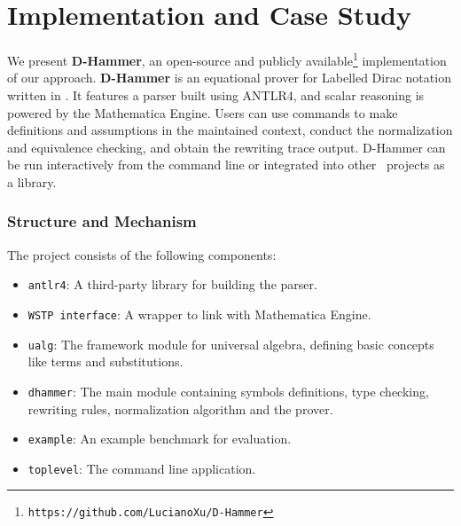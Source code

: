 
\section{Implementation and Case Study}
We present \textbf{D-Hammer}, an open-source
and publicly available\footnote{\texttt{https://github.com/LucianoXu/D-Hammer}}
implementation of our approach.  \textbf{D-Hammer} is an
equational prover for Labelled Dirac notation written in \CC.  It
features a parser built using ANTLR4, and scalar reasoning is powered
by the Mathematica Engine. Users can use commands to make definitions
and assumptions in the maintained context, conduct the normalization
and equivalence checking, and obtain the rewriting trace output.
D-Hammer can be run interactively from the command line or integrated
into other \CC\ projects as a library.


\subsubsection{Structure and Mechanism} 
The project consists of the following components:
\begin{itemize}
    \item \texttt{antlr4}: A third-party library for building the parser.
    \item \texttt{WSTP interface}: A wrapper to link with Mathematica Engine.
    \item \texttt{ualg}: The framework module for universal algebra, defining basic concepts like terms and substitutions.
    \item \texttt{dhammer}: The main module containing symbols definitions, type checking, rewriting rules, normalization algorithm and the prover.
    \item \texttt{example}: An example benchmark for evaluation.
    \item \texttt{toplevel}: The command line application.
\end{itemize}

% 

